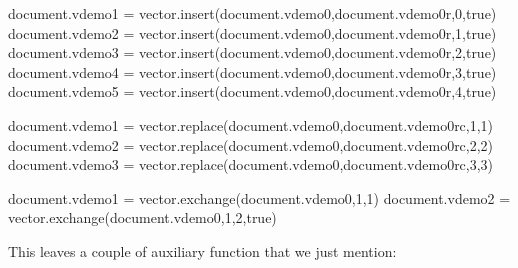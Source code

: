 \typebuffer[option=TEX] \getbuffer

\startlinecorrection
{} {}
    {} {}
    {} {}
    {} {}
    {} {}
\stopcombination
\stoplinecorrection

\startbuffer
\startluacode
document.vdemo1 = vector.insert(document.vdemo0,document.vdemo0r,0,true)
document.vdemo2 = vector.insert(document.vdemo0,document.vdemo0r,1,true)
document.vdemo3 = vector.insert(document.vdemo0,document.vdemo0r,2,true)
document.vdemo4 = vector.insert(document.vdemo0,document.vdemo0r,3,true)
document.vdemo5 = vector.insert(document.vdemo0,document.vdemo0r,4,true)
\stopluacode
\stopbuffer

\typebuffer[option=TEX] \getbuffer

\startlinecorrection
{} {}
    {} {}
    {} {}
    {} {}
    {} {}
\stopcombination
\stoplinecorrection

\startbuffer
\startluacode
document.vdemo1 = vector.replace(document.vdemo0,document.vdemo0rc,1,1)
document.vdemo2 = vector.replace(document.vdemo0,document.vdemo0rc,2,2)
document.vdemo3 = vector.replace(document.vdemo0,document.vdemo0rc,3,3)
\stopluacode
\stopbuffer

\typebuffer[option=TEX] \getbuffer

\startlinecorrection
{} {}
    {} {}
    {} {}
\stopcombination
\stoplinecorrection

\startbuffer
\startluacode
document.vdemo1 = vector.exchange(document.vdemo0,1,1)
document.vdemo2 = vector.exchange(document.vdemo0,1,2,true)
\stopluacode
\stopbuffer

\typebuffer[option=TEX] \getbuffer

\startlinecorrection
{} {}
    {} {}
\stopcombination
\stoplinecorrection

This leaves a couple of auxiliary function that we just mention:

